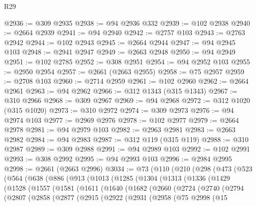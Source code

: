 \begin{lexlean}{R29}
\begin{coremodule}
@2936 := @309 @2935
@2938 := @94 @2936 @332
@2939 := @102 @2938
@2940 := @2664 @2939
@2941 := @94 @2940
@2942 := @2757 @103
@2943 := @2763 @2942
@2944 := @102 @2943
@2945 := @2664 @2944
@2947 := @94 @2945 @103
@2948 := @2941 @2947
@2949 := @2663 @2948
@2950 := @94 @2949
@2951 := @102 @2785
@2952 := @308 @2951
@2954 := @94 @2952 @103
@2955 := @2950 @2954
@2957 := @2661 (@2663 @2955)
@2958 := @75 @2957
@2959 := @2708 @103
@2960 := @2714 @2959
@2961 := @102 @2960
@2962 := @2664 @2961
@2963 := @94 @2962
@2966 := @312 @1343 (@315 @1343)
@2967 := @310 @2966
@2968 := @309 @2967
@2969 := @94 @2968
@2972 := @312 @1020 (@315 @1020)
@2973 := @310 @2972
@2974 := @309 @2973
@2976 := @94 @2974 @103
@2977 := @2969 @2976
@2978 := @102 @2977
@2979 := @2664 @2978
@2981 := @94 @2979 @103
@2982 := @2963 @2981
@2983 := @2663 @2982
@2984 := @94 @2983
@2987 := @312 @119 (@315 @119)
@2988 := @310 @2987
@2989 := @309 @2988
@2991 := @94 @2989 @103
@2992 := @102 @2991
@2993 := @308 @2992
@2995 := @94 @2993 @103
@2996 := @2984 @2995
@2998 := @2661 (@2663 @2996)
@3034 := @73
    (@110
      (@210
        (@298
          (@473
            (@523
              (@564
                (@638
                  (@886
                    (@913
                      (@1013
                        (@1285
                          (@1304
                            (@1313
                              (@1336
                                (@1429
                                  (@1528
                                    (@1557
                                      (@1581
                                        (@1611
                                          (@1640
                                            (@1682
                                              (@2660
                                                (@2724
                                                  (@2740
                                                    (@2794
                                                      (@2807
                                                        (@2858
                                                          (@2877
                                                            (@2915
                                                              (@2922
                                                                (@2931
                                                                  (@2958
                                                                    (@75
                                                                      @2998
                                                                      (@15

\end{coremodule}
\end{lexlean}
